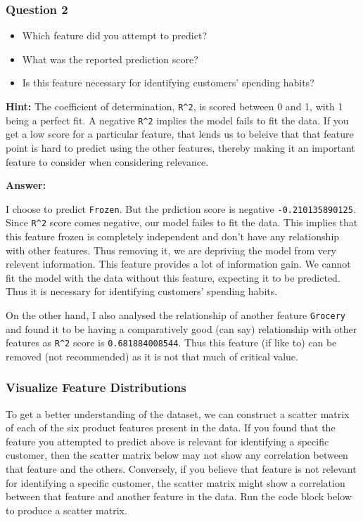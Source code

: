 \documentclass[11pt]{article}
\providecommand{\tightlist}{%
      \setlength{\itemsep}{0pt}\setlength{\parskip}{0pt}}
\begin{document}
    \hypertarget{question-2}{%
\subsubsection{Question 2}\label{question-2}}

\begin{itemize}
\tightlist
\item
  Which feature did you attempt to predict?
\item
  What was the reported prediction score?
\item
  Is this feature necessary for identifying customers' spending habits?
\end{itemize}

\textbf{Hint:} The coefficient of determination, \texttt{R\^{}2}, is
scored between 0 and 1, with 1 being a perfect fit. A negative
\texttt{R\^{}2} implies the model fails to fit the data. If you get a
low score for a particular feature, that lends us to beleive that that
feature point is hard to predict using the other features, thereby
making it an important feature to consider when considering relevance.

    \textbf{Answer:}

I choose to predict \texttt{Frozen}. But the prdiction score is negative
\texttt{-0.210135890125}. Since \texttt{R\^{}2} score comes negative,
our model failes to fit the data. This implies that this feature frozen
is completely independent and don't have any relationship with other
features. Thus removing it, we are depriving the model from very
relevent information. This feature provides a lot of information gain.
We cannot fit the model with the data without this feature, expecting it
to be predicted. Thus it is necessary for identifying customers'
spending habits.

On the other hand, I also analysed the relationship of another feature
\texttt{Grocery} and found it to be having a comparatively good (can
say) relationship with other features as \texttt{R\^{}2} score is
\texttt{0.681884008544}. Thus this feature (if like to) can be removed
(not recommended) as it is not that much of critical value.

    \hypertarget{visualize-feature-distributions}{%
\subsubsection{Visualize Feature
Distributions}\label{visualize-feature-distributions}}

To get a better understanding of the dataset, we can construct a scatter
matrix of each of the six product features present in the data. If you
found that the feature you attempted to predict above is relevant for
identifying a specific customer, then the scatter matrix below may not
show any correlation between that feature and the others. Conversely, if
you believe that feature is not relevant for identifying a specific
customer, the scatter matrix might show a correlation between that
feature and another feature in the data. Run the code block below to
produce a scatter matrix.
\end{document}
